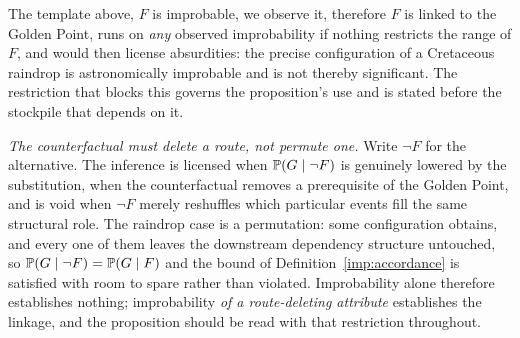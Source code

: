 \begin{remark}\label{gc:rem:flukescope}
The template above, $F$ is improbable, we observe it, therefore $F$
is linked to the Golden Point, runs on \emph{any} observed
improbability if nothing restricts the range of $F$, and would then
license absurdities: the precise configuration of a Cretaceous
raindrop is astronomically improbable and is not thereby significant.
The restriction that blocks this governs the proposition's use and is
stated before the stockpile that depends on it.

\emph{The counterfactual must delete a route, not permute one.} Write
$\neg F$ for the alternative. The inference is licensed when
$\mathbb{P}(G\mid\neg F)$ is genuinely lowered by the substitution, when
the counterfactual removes a prerequisite of the Golden Point, and
is void when $\neg F$ merely reshuffles which particular events fill
the same structural role. The raindrop case is a permutation: some
configuration obtains, and every one of them leaves the downstream
dependency structure untouched, so $\mathbb{P}(G\mid\neg F)=\mathbb{P}(G\mid F)$ and
the bound of Definition~\ref{imp:accordance} is satisfied with room to spare
rather than violated. Improbability alone therefore establishes
nothing; improbability \emph{of a route-deleting attribute}
establishes the linkage, and the proposition should be read with that
restriction throughout.


\end{remark}

